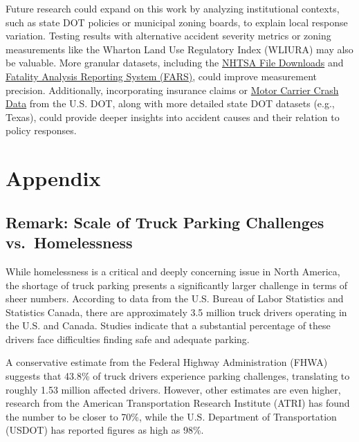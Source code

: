\documentclass[
  12pt]{article}
\begin{document}
Future research could expand on this work by analyzing institutional
contexts, such as state DOT policies or municipal zoning boards, to
explain local response variation. Testing results with alternative
accident severity metrics or zoning measurements like the Wharton Land
Use Regulatory Index (WLIURA) \citep{gyourkoNewMeasureLocal2008} may
also be valuable. More granular datasets, including the
\href{https://www.nhtsa.gov/file-downloads}{NHTSA File Downloads} and
\href{https://www.nhtsa.gov/research-data/fatality-analysis-reporting-system-fars}{Fatality
Analysis Reporting System (FARS)}, could improve measurement precision.
Additionally, incorporating insurance claims or
\href{https://data.transportation.gov/Trucking-and-Motorcoaches/Motor-Carrier-Crash-Data-/b8e5-isfj}{Motor
Carrier Crash Data} from the U.S. DOT, along with more detailed state
DOT datasets (e.g., Texas), could provide deeper insights into accident
causes and their relation to policy responses.

\section{\texorpdfstring{\textbf{Appendix}}{Appendix}}\label{appendix}

\subsection{Remark: Scale of Truck Parking Challenges
vs.~Homelessness}\label{remark-scale-of-truck-parking-challenges-vs.-homelessness}

While homelessness is a critical and deeply concerning issue in North
America, the shortage of truck parking presents a significantly larger
challenge in terms of sheer numbers. According to data from the U.S.
Bureau of Labor Statistics and Statistics Canada, there are
approximately 3.5 million truck drivers operating in the U.S. and
Canada. Studies indicate that a substantial percentage of these drivers
face difficulties finding safe and adequate parking.

A conservative estimate from the Federal Highway Administration (FHWA)
suggests that 43.8\% of truck drivers experience parking challenges,
translating to roughly 1.53 million affected drivers. However, other
estimates are even higher, research from the American Transportation
Research Institute (ATRI) has found the number to be closer to 70\%,
while the U.S. Department of Transportation (USDOT) has reported figures
as high as 98\%.
\end{document}
